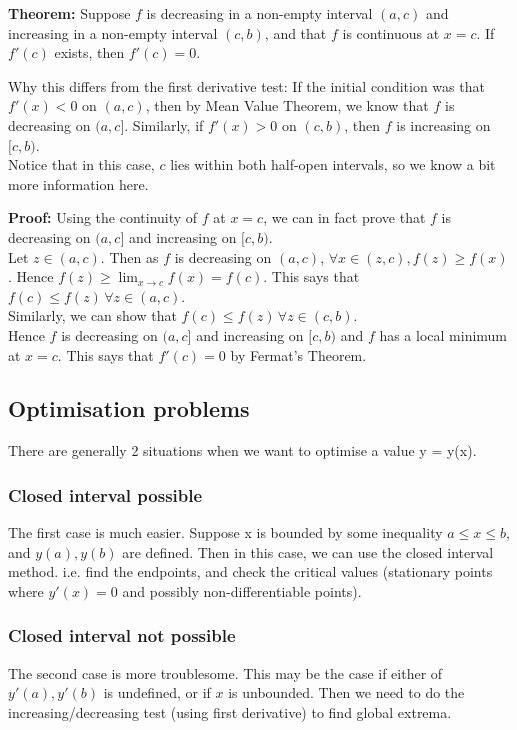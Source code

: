 \documentclass{article}
\begin{document}
\textbf{Theorem:} Suppose $f$ is decreasing in a non-empty interval $(a,c)$ and increasing in a non-empty interval $(c,b)$, and that $f$ is continuous at $x=c$. If $f'(c)$ exists, then $f'(c)=0$.

Why this differs from the first derivative test: If the initial condition was that $f'(x)<0$ on $(a,c)$, then by Mean Value Theorem, we know that $f$ is decreasing on $(a,c]$. Similarly, if $f'(x)>0$ on $(c,b)$, then $f$ is increasing on $[c,b)$.\\
Notice that in this case, $c$ lies within both half-open intervals, so we know a bit more information here.

\textbf{Proof:} Using the continuity of $f$ at $x=c$, we can in fact prove that $f$ is decreasing on $(a,c]$ and increasing on $[c,b)$.\\
Let $z\in (a,c)$. Then as $f$ is decreasing on $(a,c)$, $\forall x\in (z,c), f(z)\geq f(x)$. Hence $f(z)\geq \lim_{x\rightarrow c}f(x)=f(c)$. This says that $f(c)\leq f(z)\, \forall z\in (a,c)$.\\
Similarly, we can show that $f(c)\leq f(z)\, \forall z\in (c,b)$.\\
Hence $f$ is decreasing on $(a,c]$ and increasing on $[c,b)$ and $f$ has a local minimum at $x=c$. This says that $f'(c)=0$ by Fermat's Theorem.

\subsection{Optimisation problems}
There are generally 2 situations when we want to optimise a value y = y(x).
\subsubsection{Closed interval possible}
The first case is much easier. Suppose x is bounded by some inequality $a\leq x\leq b$, and $y(a),y(b)$ are defined. Then in this case, we can use the closed interval method. i.e. find the endpoints, and check the critical values (stationary points where $y'(x)=0$ and possibly non-differentiable points).

\subsubsection{Closed interval not possible}
The second case is more troublesome. This may be the case if either of $y'(a),y'(b)$ is undefined, or if $x$ is unbounded. Then we need to do the increasing/decreasing test (using first derivative) to find global extrema.
\end{document}
